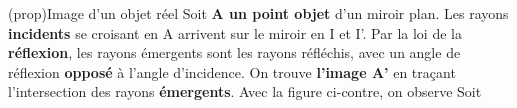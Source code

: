 \documentclass[../../main/main.tex]{subfiles}
\begin{document}
\begin{tcb}[label=prop, sidebyside, righthand ratio=.4](prop){Image d'un objet réel}
	Soit \textbf{A un point objet} d'un miroir plan. Les rayons \textbf{incidents}
	se croisant en A arrivent sur le miroir en I et I'. Par la loi de la
	\textbf{réflexion}, les rayons émergents sont les rayons réfléchis, avec un
	angle de réflexion \textbf{opposé} à l'angle d'incidence. On trouve
	\textbf{l'image A'} en traçant l'intersection des rayons \textbf{émergents}.
	\bigbreak
	Avec la figure ci-contre, on observe
	\psw{
		\[
			\tan(i) =
			\frac{\obar{\rm HI}}{\obar{\rm HA}} =
			\frac{\obar{\rm HI}}{-\obar{\rm HA'}}
		\]
	}
	Soit
	\psw{
		\[
			\boxed{\obar{\rm HA'} = -\obar{\rm HA}}
		\]
	}
	\tcblower
	\begin{center}
		\label{fig:mir_plan-obj_r}
	\end{center}
\end{tcb}
\end{document}
